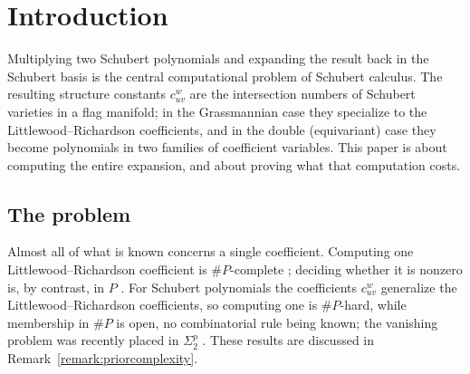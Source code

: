 \documentclass{amsart}
\newtheorem{theorem}[lemma]{Theorem}
\theoremstyle{definition}
\theoremstyle{remark}
\numberwithin{equation}{section}
\DeclareMathOperator{\sch}{\mathfrak{S}}
\newcommand{\tom}[1]{\ensuremath{\xrightarrow{#1}}}
\begin{document}
\section{Introduction}

Multiplying two Schubert polynomials and expanding the result back in the Schubert basis is the central computational problem of Schubert calculus. The resulting structure constants $c_{uv}^w$ are the intersection numbers of Schubert varieties in a flag manifold; in the Grassmannian case they specialize to the Littlewood--Richardson coefficients, and in the double (equivariant) case they become polynomials in two families of coefficient variables. This paper is about computing the entire expansion, and about proving what that computation costs.

\subsection{The problem}

Almost all of what is known concerns a single coefficient. Computing one Littlewood--Richardson coefficient is $\#P$-complete \cite{narayanan2006complexity}; deciding whether it is nonzero is, by contrast, in $P$ \cite{knutson1999honeycomb,burgisser2013positivity}. For Schubert polynomials the coefficients $c_{uv}^w$ generalize the Littlewood--Richardson coefficients, so computing one is $\#P$-hard, while membership in $\#P$ is open, no combinatorial rule being known; the vanishing problem was recently placed in $\Sigma_2^p$ \cite{pak2024vanishing}. These results are discussed in Remark~\ref{remark:priorcomplexity}.
\end{document}
